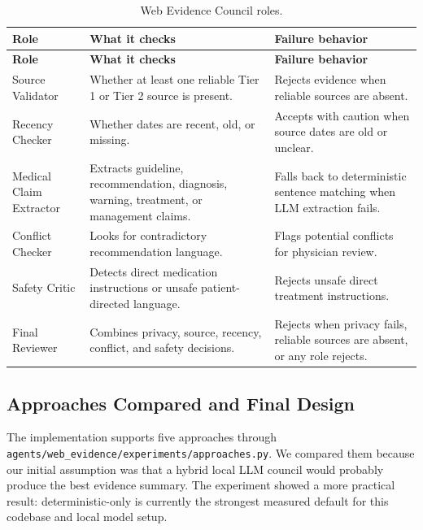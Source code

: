 \begin{longtable}{p{} p{} p{}}
\caption{Web Evidence Council roles.}
\label{tab:web_council_roles}\\
\toprule
\textbf{Role} & \textbf{What it checks} & \textbf{Failure behavior}\\
\midrule
\endfirsthead
\toprule
\textbf{Role} & \textbf{What it checks} & \textbf{Failure behavior}\\
\midrule
\endhead
Source Validator & Whether at least one reliable Tier 1 or Tier 2 source is present. & Rejects evidence when reliable sources are absent.\\
Recency Checker & Whether dates are recent, old, or missing. & Accepts with caution when source dates are old or unclear.\\
Medical Claim Extractor & Extracts guideline, recommendation, diagnosis, warning, treatment, or management claims. & Falls back to deterministic sentence matching when LLM extraction fails.\\
Conflict Checker & Looks for contradictory recommendation language. & Flags potential conflicts for physician review.\\
Safety Critic & Detects direct medication instructions or unsafe patient-directed language. & Rejects unsafe direct treatment instructions.\\
Final Reviewer & Combines privacy, source, recency, conflict, and safety decisions. & Rejects when privacy fails, reliable sources are absent, or any role rejects.\\
\bottomrule
\end{longtable}

\subsection{Approaches Compared and Final Design}

The implementation supports five approaches through \texttt{agents/web\_evidence/experiments/approaches.py}. We compared them because our initial assumption was that a hybrid local LLM council would probably produce the best evidence summary. The experiment showed a more practical result: deterministic-only is currently the strongest measured default for this codebase and local model setup.


